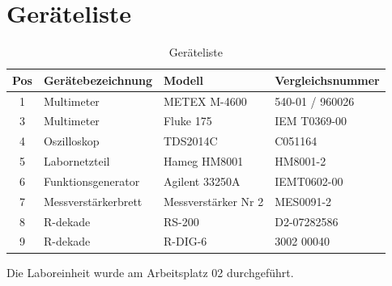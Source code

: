 \section{Geräteliste}\label{sec:geraeteliste}

\begin{table}[h]
	\centering
	\caption{Geräteliste}\label{tab:geraeteliste}
	\begin{tabularx}{\columnwidth}{cXXX}
		Pos & \textbf{Gerätebezeichnung} & \textbf{Modell}     & \textbf{Vergleichsnummer} \\ \midrule
		1   & Multimeter                 & METEX M-4600        & 540-01 / 960026           \\
		3   & Multimeter                 & Fluke 175           & IEM T0369-00              \\
		4   & Oszilloskop                & TDS2014C            & C051164                   \\
		5   & Labornetzteil              & Hameg HM8001        & HM8001-2                  \\
		6   & Funktionsgenerator         & Agilent 33250A      & IEMT0602-00               \\
		7   & Messverstärkerbrett        & Messverstärker Nr 2 & MES0091-2                 \\
		8   & R-dekade                   & RS-200              & D2-07282586               \\
		9   & R-dekade                   & R-DIG-6             & 3002 00040                \\
	\end{tabularx}
\end{table}

Die Laboreinheit wurde am Arbeitsplatz 02 durchgeführt.
